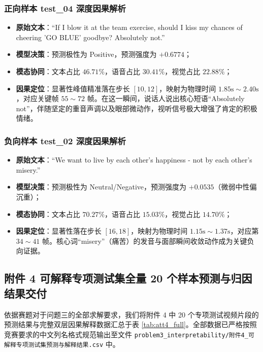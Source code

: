 \subsubsection{正向样本 test\_04 深度因果解析}
\begin{itemize}
    \item \textbf{原始文本}：``If I blow it at the team exercise, should I kiss my chances of cheering 'GO BLUE' goodbye? Absolutely not.''
    \item \textbf{模型决策}：预测极性为 Positive，预测强度为 $+0.6774$；
    \item \textbf{模态协同}：文本占比 $46.71\%$，语音占比 $30.41\%$，视觉占比 $22.88\%$；
    \item \textbf{因果定位}：显著性峰值精准落在步长 $[10, 12]$，映射为物理时间 $1.85\text{s} \sim 2.40\text{s}$，对应关键帧 $55 \sim 72$ 帧。在这一瞬间，说话人说出核心短语“Absolutely not”，伴随坚定的重音声调以及眼部微动作，视听信号极大增强了肯定的积极情绪。
\end{itemize}

\subsubsection{负向样本 test\_02 深度因果解析}
\begin{itemize}
    \item \textbf{原始文本}：``We want to live by each other's happiness - not by each other's misery.''
    \item \textbf{模型决策}：预测极性为 Neutral/Negative，预测强度为 $+0.0535$（微弱中性偏沉重）；
    \item \textbf{模态协同}：文本占比 $70.27\%$，语音占比 $15.03\%$，视觉占比 $14.70\%$；
    \item \textbf{因果定位}：显著性落在步长 $[16, 18]$，映射为物理时间 $1.15\text{s} \sim 1.37\text{s}$，对应第 $34 \sim 41$ 帧。核心词“misery”（痛苦）的发音与面部瞬间收敛动作成为关键负向证据。

\end{itemize}

\subsection{附件 4 可解释专项测试集全量 20 个样本预测与归因结果交付}
依据赛题对于问题三的全部求解要求，我们将附件 4 中 20 个专项测试视频片段的预测结果与完整双层因果解释数据汇总于表 \ref{tab:att4_full}。全部数据已严格按照竞赛要求的中文列名格式规范输出至文件 \texttt{problem3\_interpretability/附件4\_可解释专项测试集预测与解释结果.csv} 中。


